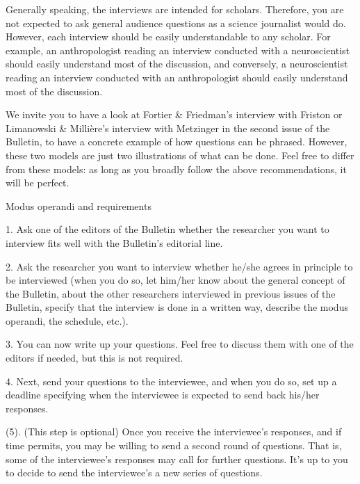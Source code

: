 \documentclass[11pt]{article}
\begin{document}
Generally speaking, the interviews are intended for scholars. Therefore, you are not expected to ask general audience questions as a science journalist would do. However, each interview should be easily understandable to any scholar. For example, an anthropologist reading an interview conducted with a neuroscientist should easily understand most of the discussion, and conversely, a neuroscientist reading an interview conducted with an anthropologist should easily understand most of the discussion.\par

We invite you to have a look at Fortier \& Friedman’s interview with Friston or Limanowski \& Millière’s interview with Metzinger in the second issue of the Bulletin, to have a concrete example of how questions can be phrased. However, these two models are just two illustrations of what can be done. Feel free to differ from these models: as long as you broadly follow the above recommendations, it will be perfect.\par

Modus operandi and requirements\par

1. Ask one of the editors of the Bulletin whether the researcher you want to interview fits well with the Bulletin’s editorial line.\par

2. Ask the researcher you want to interview whether he/she agrees in principle to be interviewed (when you do so, let him/her know about the general concept of the Bulletin, about the other researchers interviewed in previous issues of the Bulletin, specify that the interview is done in a written way, describe the modus operandi, the schedule, etc.).\par

3. You can now write up your questions. Feel free to discuss them with one of the editors if needed, but this is not required.\par

4. Next, send your questions to the interviewee, and when you do so, set up a deadline specifying when the interviewee is expected to send back his/her responses.\par

(5). (This step is optional) Once you receive the interviewee’s responses, and if time permits, you may be willing to send a second round of questions. That is, some of the interviewee’s responses may call for further questions. It’s up to you to decide to send the interviewee’s a new series of questions.\par
\end{document}
